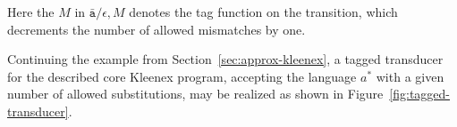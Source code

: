 \begin{center}
\end{center}

Here the $M$ in $\bar{\mathtt{a}}/\epsilon, M$ denotes the tag function on the
transition, which decrements the number of allowed mismatches by one.

Continuing the example from Section~\ref{sec:approx-kleenex}, a tagged
transducer for the described core Kleenex program, accepting the language $a^*$
with a given number of allowed substitutions, may be realized as shown in
Figure~\ref{fig:tagged-transducer}.

